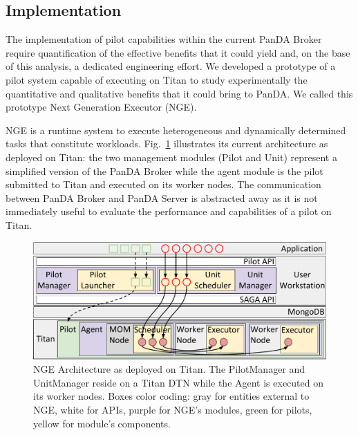 \subsection{Implementation}
\label{sec:arch}

The implementation of pilot capabilities within the current PanDA Broker require
quantification of the effective benefits that it could yield and, on the base of
this analysis, a dedicated engineering effort. We developed a prototype of a
pilot system capable of executing on Titan to study experimentally the
quantitative and qualitative benefits that it could bring to PanDA. We called
this prototype Next Generation Executor (NGE).

NGE is a runtime system to execute heterogeneous and dynamically determined
tasks that constitute workloads. Fig.~\ref{fig:arch-overview} illustrates its
current architecture as deployed on Titan: the two management modules (Pilot
and Unit) represent a simplified version of the PanDA Broker while the agent
module is the pilot submitted to Titan and executed on its worker nodes. The
communication between PanDA Broker and PanDA Server is abstracted away as it
is not immediately useful to evaluate the performance and capabilities of a
pilot on Titan.

\begin{figure}
  \centering
   \includegraphics[width=\columnwidth]{figures/rp_architecture_compact_atlaswms_paper.pdf}
  \caption{NGE Architecture as deployed on Titan. The PilotManager and 
  UnitManager reside on a Titan DTN while the Agent is executed on
  its worker nodes. Boxes color coding: gray for entities external to NGE,
  white for APIs, purple for NGE's modules, green for pilots, yellow for
  module's components.}
\label{fig:arch-overview}
\end{figure}

